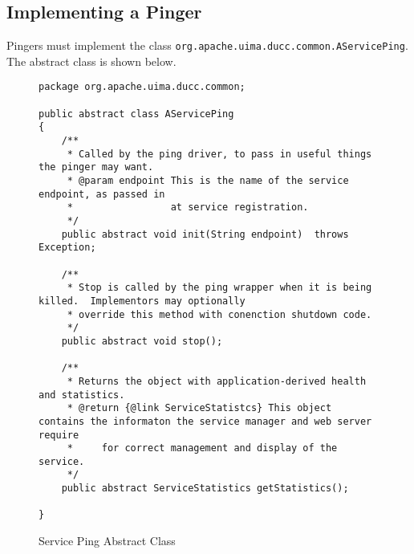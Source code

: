       \subsection{Implementing a Pinger}
      Pingers must implement the class {\tt org.apache.uima.ducc.common.AServicePing}.  The abstract class
      is shown below.
      \begin{figure}[H]
\begin{verbatim}
package org.apache.uima.ducc.common;

public abstract class AServicePing
{
    /**
     * Called by the ping driver, to pass in useful things the pinger may want.
     * @param endpoint This is the name of the service endpoint, as passed in
     *                 at service registration.
     */
    public abstract void init(String endpoint)  throws Exception;

    /**
     * Stop is called by the ping wrapper when it is being killed.  Implementors may optionally
     * override this method with conenction shutdown code.
     */
    public abstract void stop();

    /**
     * Returns the object with application-derived health and statistics.
     * @return {@link ServiceStatistcs} This object contains the informaton the service manager and web server require
     *     for correct management and display of the service.
     */
    public abstract ServiceStatistics getStatistics();
    
}
\end{verbatim}
        \caption{Service Ping Abstract Class}
        \label{fig:service.abstract.pinger}

      \end{figure}
      
